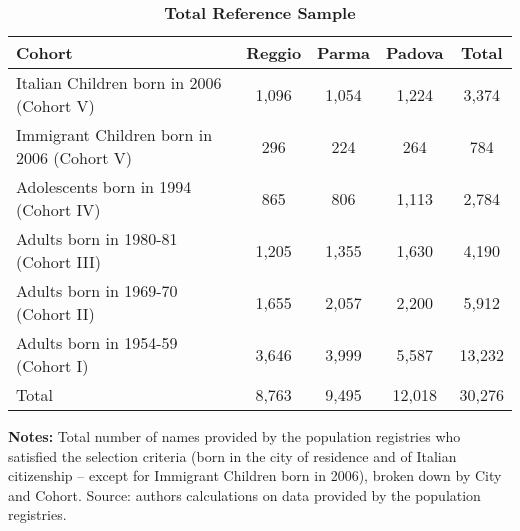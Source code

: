 \documentclass{article}
\begin{document}
\begin{table}[ht!]
\caption{\textbf{Total Reference Sample}}
\label{tab:TotRefSample}
\vspace{-5mm}
\begin{center}
\begin{tabular}{ l c c c c }
\hline\hline
\textbf{Cohort} & \textbf{Reggio} & \textbf{Parma} & \textbf{Padova} & \textbf{Total}\\
\hline
Italian Children born in 2006 (Cohort V)   & 1,096 & 1,054 & 1,224 & 3,374\\[0.2em]
Immigrant Children born in 2006 (Cohort V) &   296 &   224 &   264 &   784\\[0.2em]
Adolescents born in 1994 (Cohort IV)       &   865 &   806 & 1,113 & 2,784\\[0.2em]
Adults born in 1980-81 (Cohort III)        & 1,205 & 1,355 & 1,630 & 4,190\\[0.2em]
Adults born in 1969-70 (Cohort II)         & 1,655 & 2,057 & 2,200 & 5,912\\[0.2em]
Adults born in 1954-59 (Cohort I)          & 3,646 & 3,999 & 5,587 & 13,232\\[0.2em]
\hline
Total                                      & 8,763 & 9,495 & 12,018 & 30,276\\
\hline
\end{tabular}
\end{center}
\footnotesize{{\bfseries Notes:} Total number of names provided by the population registries who satisfied the selection criteria (born in the city of residence and of Italian citizenship -- except for Immigrant Children born in 2006), broken down by City and Cohort. Source: authors calculations on data provided by the population registries.}
\end{table} 
\end{document}

